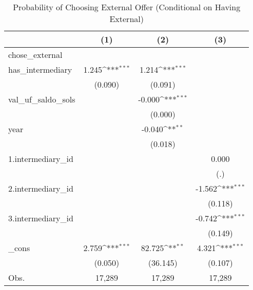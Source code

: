 \begin{table}[htbp]\centering
\def\sym#1{\ifmmode^{#1}\else\(^{#1}\)\fi}
\caption{Probability of Choosing External Offer (Conditional on Having External)}
\begin{tabular}{l*{3}{c}}
\hline\hline
            &\multicolumn{1}{c}{(1)}         &\multicolumn{1}{c}{(2)}         &\multicolumn{1}{c}{(3)}         \\
\hline
chose\_external&                     &                     &                     \\
has\_intermediary&       1.245\sym{***}&       1.214\sym{***}&                     \\
            &     (0.090)         &     (0.091)         &                     \\
[1em]
val\_uf\_saldo\_sols&                     &      -0.000\sym{***}&                     \\
            &                     &     (0.000)         &                     \\
[1em]
year        &                     &      -0.040\sym{**} &                     \\
            &                     &     (0.018)         &                     \\
[1em]
1.intermediary\_id&                     &                     &       0.000         \\
            &                     &                     &         (.)         \\
[1em]
2.intermediary\_id&                     &                     &      -1.562\sym{***}\\
            &                     &                     &     (0.118)         \\
[1em]
3.intermediary\_id&                     &                     &      -0.742\sym{***}\\
            &                     &                     &     (0.149)         \\
[1em]
\_cons      &       2.759\sym{***}&      82.725\sym{**} &       4.321\sym{***}\\
            &     (0.050)         &    (36.145)         &     (0.107)         \\
\hline
Obs.        &      17,289         &      17,289         &      17,289         \\
\hline\hline
\end{tabular}
\end{table}
